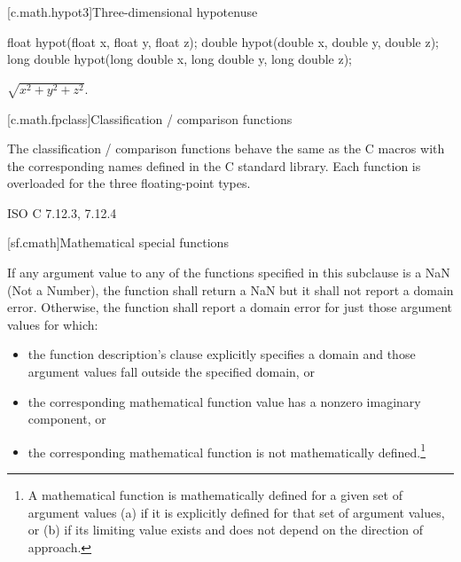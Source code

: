
[c.math.hypot3]{Three-dimensional hypotenuse}

%
\begin{itemdecl}
float hypot(float x, float y, float z);
double hypot(double x, double y, double z);
long double hypot(long double x, long double y, long double z);
\end{itemdecl}

\begin{itemdescr}
\pnum
\returns $\sqrt{x^2+y^2+z^2}$.
\end{itemdescr}

[c.math.fpclass]{Classification / comparison functions}

\pnum
The classification / comparison functions behave the same as the C macros with the
corresponding names defined in the C standard library.
Each function is overloaded for the three floating-point types.

\xref
ISO C 7.12.3, 7.12.4

[sf.cmath]{Mathematical special functions}%
%

\pnum{}%
If any argument value
to any of the functions specified in this subclause
is a NaN (Not a Number),
the function shall return a NaN
but it shall not report a domain error.
Otherwise,
the function shall report a domain error
for just those argument values
for which:

\begin{itemize}
  \item
  the function description's \returns clause
  explicitly specifies a domain
  and those argument values fall
  outside the specified domain,
  or

  \item
  the corresponding mathematical function value
  has a nonzero imaginary component,
  or

  \item
  the corresponding mathematical function
  is not mathematically defined.\footnote{%
    A mathematical function
    is mathematically defined
    for a given set of argument values
    (a)
      if it is explicitly defined
      for that set of argument values,
      or
    (b)
      if its limiting value exists
      and does not depend
      on the direction of approach.}
\end{itemize}

